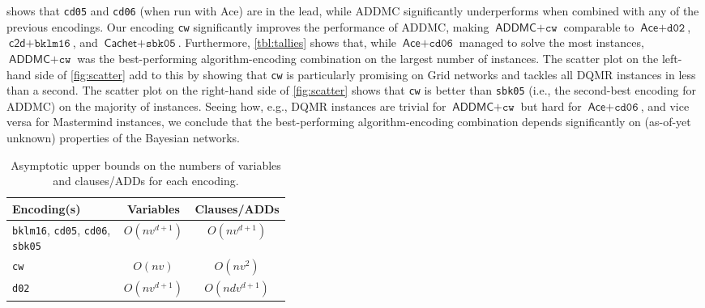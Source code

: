 \documentclass[accepted]{uai2021}
\theoremstyle{definition}
\begin{document}
 shows that \texttt{cd05}
\citep{DBLP:conf/ijcai/ChaviraD05} and \texttt{cd06}
\citep{DBLP:conf/sat/ChaviraD06} (when run with \textsf{Ace}) are in the lead,
while \textsf{ADDMC} \citep{DBLP:conf/aaai/DudekPV20} significantly
underperforms when combined with any of the previous encodings. Our encoding
\texttt{cw} significantly improves the performance of \textsf{ADDMC}, making
$\textsf{ADDMC}+\texttt{cw}$ comparable to $\textsf{Ace}+\texttt{d02}$,
$\textsf{c2d}+\texttt{bklm16}$, and $\textsf{Cachet}+\texttt{sbk05}$.
Furthermore, \cref{tbl:tallies} shows that, while $\textsf{Ace}+\texttt{cd06}$
managed to solve the most instances, $\textsf{ADDMC}+\texttt{cw}$ was the
best-performing algorithm-encoding combination on the largest number of
instances. The scatter plot on the left-hand side of \cref{fig:scatter} add to
this by showing that \texttt{cw} is particularly promising on Grid networks and
tackles all DQMR instances in less than a second. The scatter plot on the
right-hand side of \cref{fig:scatter} shows that \texttt{cw} is better than
\texttt{sbk05} \citep{DBLP:conf/aaai/SangBK05} (i.e., the second-best encoding
for \textsf{ADDMC}) on the majority of instances. Seeing how, e.g., DQMR
instances are trivial for $\textsf{ADDMC}+\texttt{cw}$ but hard for
$\textsf{Ace}+\texttt{cd06}$, and vice versa for Mastermind instances, we
conclude that the best-performing algorithm-encoding combination depends
significantly on (as-of-yet unknown) properties of the Bayesian networks.

\begin{table}
  \centering
  \caption{Asymptotic upper bounds on the numbers of variables and clauses/ADDs
    for each encoding.}
  \label{tbl:asymptotes}
  \begin{tabular}{m{0.4\linewidth} c c}
    \toprule
    Encoding(s) & Variables & Clauses/ADDs \\
    \midrule
    \texttt{bklm16}, \texttt{cd05}, \texttt{cd06}, \texttt{sbk05} & $O(nv^{d+1})$ & $O(nv^{d+1})$ \\
    \texttt{cw} & $O(nv)$ & $O(nv^2)$ \\
    \texttt{d02} & $O(nv^{d+1})$ & $O(ndv^{d+1})$ \\
    \bottomrule
  \end{tabular}
\end{table}
\end{document}
